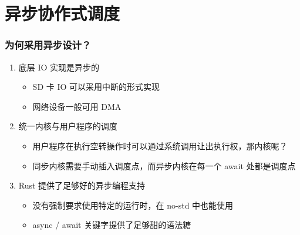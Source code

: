 \section{异步协作式调度}

\begin{frame}
    \frametitle{为何采用异步设计？}

    \begin{enumerate}
        \item 底层 IO 实现是异步的
              \begin{itemize}
                  \item SD 卡 IO 可以采用中断的形式实现
                  \item 网络设备一般可用 DMA
              \end{itemize}
        \item 统一内核与用户程序的调度
              \begin{itemize}
                  \item 用户程序在执行空转操作时可以通过系统调用让出执行权，那内核呢？
                  \item 同步内核需要手动插入调度点，而异步内核在每一个 await 处都是调度点
              \end{itemize}
        \item Rust 提供了足够好的异步编程支持
              \begin{itemize}
                  \item 没有强制要求使用特定的运行时，在 no-std 中也能使用
                  \item async / await 关键字提供了足够甜的语法糖
              \end{itemize}
    \end{enumerate}
\end{frame}

